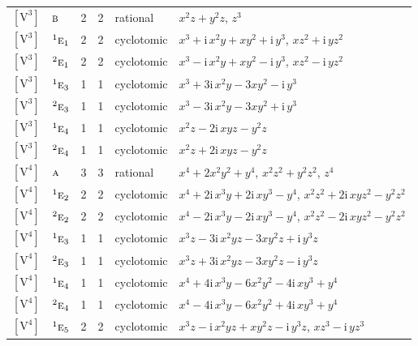 \documentclass[10pt,a4paper]{article}
\numberwithin{equation}{section}
\newcommand{\irr}[1]{\text{\normalfont\scshape #1}}
\newcommand{\conjpair}[1]{{}^{#1}}
\newcommand{\iunit}{\mathrm{i}}
\newcommand{\jahn}[1]{\mathrm{#1}}
\newlength{\fillwidth}\newlength{\cellwidth}\newlength{\colwidth}
\begin{document}
{\begin{longtable}{@{}llrrl>{\RaggedRight\arraybackslash}p{\fillwidth}@{}}
$\jahn{[V^{3}]}$ & $\irr{b}$ & 2 & 2 & rational & $x^{2}z + y^{2}z$, $z^{3}$\\
$\jahn{[V^{3}]}$ & $\conjpair{1}\irr{e}_{1}$ & 2 & 2 & cyclotomic & $x^{3} + \iunit{}\,x^{2}y + xy^{2} + \iunit{}\,y^{3}$, $xz^{2} + \iunit{}\,yz^{2}$\\
$\jahn{[V^{3}]}$ & $\conjpair{2}\irr{e}_{1}$ & 2 & 2 & cyclotomic & $x^{3} - \iunit{}\,x^{2}y + xy^{2} - \iunit{}\,y^{3}$, $xz^{2} - \iunit{}\,yz^{2}$\\
$\jahn{[V^{3}]}$ & $\conjpair{1}\irr{e}_{3}$ & 1 & 1 & cyclotomic & $x^{3} + 3\iunit{}\,x^{2}y - 3xy^{2} - \iunit{}\,y^{3}$\\
$\jahn{[V^{3}]}$ & $\conjpair{2}\irr{e}_{3}$ & 1 & 1 & cyclotomic & $x^{3} - 3\iunit{}\,x^{2}y - 3xy^{2} + \iunit{}\,y^{3}$\\
$\jahn{[V^{3}]}$ & $\conjpair{1}\irr{e}_{4}$ & 1 & 1 & cyclotomic & $x^{2}z - 2\iunit{}\,xyz - y^{2}z$\\
$\jahn{[V^{3}]}$ & $\conjpair{2}\irr{e}_{4}$ & 1 & 1 & cyclotomic & $x^{2}z + 2\iunit{}\,xyz - y^{2}z$\\
$\jahn{[V^{4}]}$ & $\irr{a}$ & 3 & 3 & rational & $x^{4} + 2x^{2}y^{2} + y^{4}$, $x^{2}z^{2} + y^{2}z^{2}$, $z^{4}$\\
$\jahn{[V^{4}]}$ & $\conjpair{1}\irr{e}_{2}$ & 2 & 2 & cyclotomic & $x^{4} + 2\iunit{}\,x^{3}y + 2\iunit{}\,xy^{3} - y^{4}$, $x^{2}z^{2} + 2\iunit{}\,xyz^{2} - y^{2}z^{2}$\\
$\jahn{[V^{4}]}$ & $\conjpair{2}\irr{e}_{2}$ & 2 & 2 & cyclotomic & $x^{4} - 2\iunit{}\,x^{3}y - 2\iunit{}\,xy^{3} - y^{4}$, $x^{2}z^{2} - 2\iunit{}\,xyz^{2} - y^{2}z^{2}$\\
$\jahn{[V^{4}]}$ & $\conjpair{1}\irr{e}_{3}$ & 1 & 1 & cyclotomic & $x^{3}z - 3\iunit{}\,x^{2}yz - 3xy^{2}z + \iunit{}\,y^{3}z$\\
$\jahn{[V^{4}]}$ & $\conjpair{2}\irr{e}_{3}$ & 1 & 1 & cyclotomic & $x^{3}z + 3\iunit{}\,x^{2}yz - 3xy^{2}z - \iunit{}\,y^{3}z$\\
$\jahn{[V^{4}]}$ & $\conjpair{1}\irr{e}_{4}$ & 1 & 1 & cyclotomic & $x^{4} + 4\iunit{}\,x^{3}y - 6x^{2}y^{2} - 4\iunit{}\,xy^{3} + y^{4}$\\
$\jahn{[V^{4}]}$ & $\conjpair{2}\irr{e}_{4}$ & 1 & 1 & cyclotomic & $x^{4} - 4\iunit{}\,x^{3}y - 6x^{2}y^{2} + 4\iunit{}\,xy^{3} + y^{4}$\\
$\jahn{[V^{4}]}$ & $\conjpair{1}\irr{e}_{5}$ & 2 & 2 & cyclotomic & $x^{3}z - \iunit{}\,x^{2}yz + xy^{2}z - \iunit{}\,y^{3}z$, $xz^{3} - \iunit{}\,yz^{3}$\\

\end{longtable}}
\end{document}
